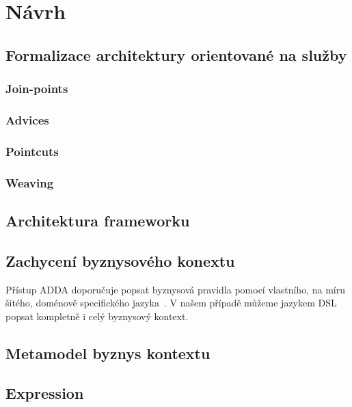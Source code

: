 \usepackage[T1]{fontenc}
\usepackage[utf8]{inputenc}


\chapter{Návrh}\label{ch:navrh}

\section{Formalizace architektury orientované na služby}

\subsection{Join-points}

\subsection{Advices}

\subsection{Pointcuts}

\subsection{Weaving}

\section{Architektura frameworku}

\section{Zachycení byznysového konextu}

Přístup ADDA doporučuje popsat byznysová pravidla pomocí
vlastního, na míru šitého, doménově specifického jazyka~\cite{cemus2015automated}.
V našem případě můžeme jazykem DSL popsat kompletně i celý
byznysový kontext.

\section{Metamodel byznys kontextu}\label{sec:metamodel}

\section{Expression}

